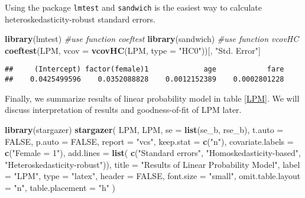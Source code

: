 \documentclass[
  12pt,
]{article}
\newenvironment{Shaded}{\begin{snugshade}}{\end{snugshade}}
\newcommand{\CommentTok}[1]{\textcolor[rgb]{0.56,0.35,0.01}{\textit{#1}}}
\newcommand{\DataTypeTok}[1]{\textcolor[rgb]{0.13,0.29,0.53}{#1}}
\newcommand{\KeywordTok}[1]{\textcolor[rgb]{0.13,0.29,0.53}{\textbf{#1}}}
\newcommand{\NormalTok}[1]{#1}
\newcommand{\OtherTok}[1]{\textcolor[rgb]{0.56,0.35,0.01}{#1}}
\newcommand{\StringTok}[1]{\textcolor[rgb]{0.31,0.60,0.02}{#1}}
\begin{document}
Using the package \texttt{lmtest} and \texttt{sandwich} is
the easiest way to calculate heteroskedasticity-robust standard errors.

\begin{Shaded}
\begin{Highlighting}[]
\KeywordTok{library}\NormalTok{(lmtest) }\CommentTok{\#use function \textasciigrave{}coeftest\textasciigrave{}}
\KeywordTok{library}\NormalTok{(sandwich) }\CommentTok{\#use function \textasciigrave{}vcovHC\textasciigrave{}}
\KeywordTok{coeftest}\NormalTok{(LPM, }\DataTypeTok{vcov =} \KeywordTok{vcovHC}\NormalTok{(LPM, }\DataTypeTok{type =} \StringTok{"HC0"}\NormalTok{))[, }\StringTok{"Std. Error"}\NormalTok{]}
\end{Highlighting}
\end{Shaded}

\begin{verbatim}
##     (Intercept) factor(female)1             age            fare 
##    0.0425499596    0.0352088828    0.0012152389    0.0002801228
\end{verbatim}

Finally, we summarize results of linear probability model in table \ref{LPM}.
We will discuss interpretation of results and goodness-of-fit of LPM later.

\begin{Shaded}
\begin{Highlighting}[]
\KeywordTok{library}\NormalTok{(stargazer)}
\KeywordTok{stargazer}\NormalTok{(}
\NormalTok{  LPM, LPM,}
  \DataTypeTok{se =} \KeywordTok{list}\NormalTok{(se\_b, rse\_b),}
  \DataTypeTok{t.auto =} \OtherTok{FALSE}\NormalTok{, }\DataTypeTok{p.auto =} \OtherTok{FALSE}\NormalTok{,}
  \DataTypeTok{report =} \StringTok{"vcs"}\NormalTok{, }\DataTypeTok{keep.stat =} \KeywordTok{c}\NormalTok{(}\StringTok{"n"}\NormalTok{),}
  \DataTypeTok{covariate.labels =} \KeywordTok{c}\NormalTok{(}\StringTok{"Female = 1"}\NormalTok{),}
  \DataTypeTok{add.lines =} \KeywordTok{list}\NormalTok{(}
    \KeywordTok{c}\NormalTok{(}\StringTok{"Standard errors"}\NormalTok{, }\StringTok{"Homoskedasticity{-}based"}\NormalTok{, }\StringTok{"Heteroskedasticity{-}robust"}\NormalTok{)),}
  \DataTypeTok{title =} \StringTok{"Results of Linear Probability Model"}\NormalTok{, }\DataTypeTok{label =} \StringTok{"LPM"}\NormalTok{,}
  \DataTypeTok{type =} \StringTok{"latex"}\NormalTok{, }\DataTypeTok{header =} \OtherTok{FALSE}\NormalTok{, }\DataTypeTok{font.size =} \StringTok{"small"}\NormalTok{,}
  \DataTypeTok{omit.table.layout =} \StringTok{"n"}\NormalTok{, }\DataTypeTok{table.placement =} \StringTok{"h"}
\NormalTok{)}
\end{Highlighting}
\end{Shaded}
\end{document}
